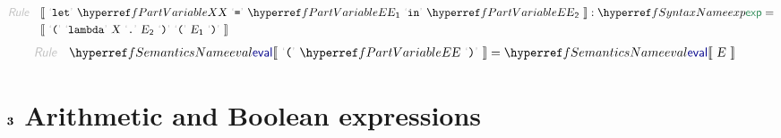 \begin{align*}
  \KEY{Rule} \quad
    & \LEFTPHRASE \
        \LEX{let} \ \VARREF{X} \ \LEX{{=}} \ \VARREF{E}\SUB{1} \ \LEX{in} \ \VARREF{E}\SUB{2} \
      \RIGHTPHRASE : \SYNREF{exp} = \\&
      \LEFTPHRASE \
        \LEX{{(}} \ \LEX{lambda} \ \VAR{X} \ \LEX{{.}} \ \VAR{E}\SUB{2} \ \LEX{{)}} \ \LEX{{(}} \ \VAR{E}\SUB{1} \ \LEX{{)}} \
      \RIGHTPHRASE
\end{align*}
\begin{align*}
  \KEY{Rule} \quad
    & \SEMREF{eval} \LEFTPHRASE \
                            \LEX{{(}} \ \VARREF{E} \ \LEX{{)}} \
                          \RIGHTPHRASE  = 
      \SEMREF{eval} \LEFTPHRASE \
                            \VAR{E} \
                          \RIGHTPHRASE 
\end{align*}
\section{$\SECT{3}$ Arithmetic and Boolean expressions}\hypertarget{sect3-arithmetic-and-boolean-expressions}{}\label{sect3-arithmetic-and-boolean-expressions}

